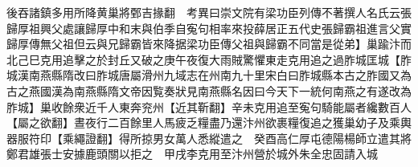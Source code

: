 後吞諸鎮多用所降黄巢將鄄吉掾翻　考異曰崇文院有梁功臣列傳不著撰人名氏云張歸厚祖興父處讓歸厚中和末與伯季自寃句相率來投薛居正五代史張歸霸祖進言父實歸厚傳無父祖但云與兄歸霸皆來降据梁功臣傳父祖與歸霸不同當是從弟】巢踰汴而北己巳克用追擊之於封丘又破之庚午夜復大雨賊驚懼東走克用追之過胙城匡城【胙城漢南燕縣隋改曰胙城唐屬滑州九域志在州南九十里宋白曰胙城縣本古之胙國又為古之燕國漢為南燕縣隋文帝因覧奏狀見南燕縣名因曰今天下一統何南燕之有遂改為胙城】巢收餘衆近千人東奔兖州【近其靳翻】辛未克用追至寃句騎能屬者纔數百人【屬之欲翻】晝夜行二百餘里人馬疲乏糧盡乃還汴州欲裹糧復追之獲巢幼子及乘輿器服符印【乘繩證翻】得所掠男女萬人悉縱遣之　癸酉高仁厚屯德陽楊師立遣其將鄭君雄張士安據鹿頭關以拒之　甲戌李克用至汴州營於城外朱全忠固請入城